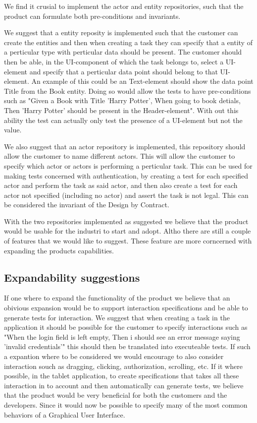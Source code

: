 We find it crusial to implement the actor and entity repositories, such that the product can formulate both pre-conditions and invariants.

We suggest that a entity reposity is implemented such that the customer can create the entities and then when creating a task they can specify that a entity of a perticular type with perticular data should be present.
The customer should then be able, in the UI-component of which the task belongs to, select a UI-element and specify that a perticular data point should belong to that UI-element.
An example of this could be an Text-element should show the data point Title from the Book entity.
Doing so would allow the tests to have pre-conditions such as "Given a Book with Title 'Harry Potter', When going to book detials, Then 'Harry Potter' should be present in the Header-element".
With out this ability the test can actually only test the presence of a UI-element but not the value.

We also suggest that an actor repository is implemented, this repository should allow the customer to name different actors.
This will allow the customer to specify which actor or actors is performing a perticular task.
This can be used for making tests concerned with authentication, by creating a test for each specified actor and perform the task as said actor, and then also create a test for each actor not specified (including no actor) and assert the task is not legal.
This can be considered the invariant of the Design by Contract.

With the two repositories implemented as suggested we believe that the product would be usable for the industri to start and adopt.
Altho there are still a couple of features that we would like to suggest.
These feature are more corncerned with expanding the products capabilities.

\subsection{Expandability suggestions}
If one where to expand the functionality of the product we believe that an obivious expansion would be to support interaction specifications and be able to generate tests for interaction.
We suggest that when creating a task in the application it should be possible for the customer to specify interactions such as "When the login field is left empty, Then i should see an error message saying 'invalid credentials'" this should then be translated into executeable tests. 
If such a expantion where to be considered we would encourage to also consider interaction souch as dragging, clicking, authorization, scrolling, etc.
If it where possible, in the tablet application, to create specifications that takes all these interaction in to account and then automatically can generate tests, we believe that the product would be very beneficial for both the customers and the developers.
Since it would now be possible to specify many of the most common behaviors of a Graphical User Interface.

